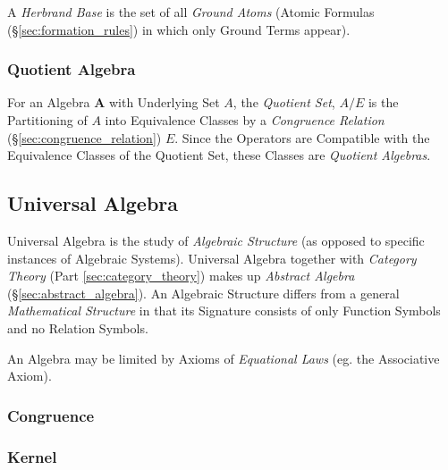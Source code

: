 A \emph{Herbrand Base} is the set of all \emph{Ground Atoms} (Atomic
Formulas (\S\ref{sec:formation_rules}) in which only Ground Terms
appear).

\subsubsection{Quotient Algebra}\label{sec:quotient_algebra}

For an Algebra $\mathbf{A}$ with Underlying Set $A$, the
\emph{Quotient Set}, $A / E$ is the Partitioning of $A$ into
Equivalence Classes by a \emph{Congruence Relation}
(\S\ref{sec:congruence_relation}) $E$. Since the Operators are
Compatible with the Equivalence Classes of the Quotient Set, these
Classes are \emph{Quotient Algebras}.



\subsection{Universal Algebra}\label{sec:universal_algebra}

Universal Algebra is the study of \emph{Algebraic Structure} (as
opposed to specific instances of Algebraic Systems). Universal Algebra
together with \emph{Category Theory} (Part \ref{sec:category_theory})
makes up \emph{Abstract Algebra} (\S\ref{sec:abstract_algebra}). An
Algebraic Structure differs from a general \emph{Mathematical
  Structure} in that its Signature consists of only Function Symbols
and no Relation Symbols.

An Algebra may be limited by Axioms of \emph{Equational Laws} (eg. the
Associative Axiom).



\subsubsection{Congruence}\label{sec:general_congruence}



\subsubsection{Kernel}\label{sec:general_kernel}

